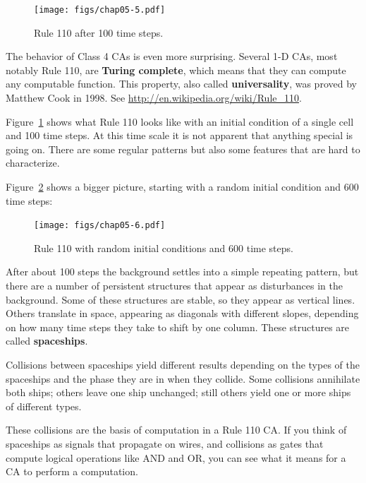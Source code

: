 \documentclass[12pt]{book}
\theoremstyle{exercise}
\begin{document}
\begin{figure}
\centerline{\texttt{[image: figs/chap05-5.pdf]}}
\caption{Rule 110 after 100 time steps.}
\label{chap05-5}
\end{figure}

The behavior of Class 4 CAs is even more surprising.  Several 1-D CAs,
most notably Rule 110, are {\bf Turing complete}, which means that
they can compute any computable function.  This property, also called
{\bf universality}, was proved by Matthew Cook in 1998.  See
\url{http://en.wikipedia.org/wiki/Rule_110}.


Figure~\ref{chap05-5} shows what Rule 110 looks like with an initial
condition of a single cell and 100 time steps.
At this time scale it is not apparent that anything special is
going on.  There are some regular patterns but also some features
that are hard to characterize.

Figure~\ref{chap05-6} shows a bigger picture, starting with a random
initial condition and 600 time steps:

\begin{figure}
\centerline{\texttt{[image: figs/chap05-6.pdf]}}
\caption{Rule 110 with random initial conditions and 600 time steps.}
\label{chap05-6}
\end{figure}

After about 100 steps the background settles into a simple repeating
pattern, but there are a number of persistent structures that appear
as disturbances in the background.  Some of these structures
are stable, so they appear as vertical lines.  Others translate in
space, appearing as diagonals with different slopes, depending on
how many time steps they take to shift by one column.  These
structures are called {\bf spaceships}.


Collisions between spaceships yield different results
depending on the types of the spaceships and the phase they are in
when they collide.  Some collisions annihilate both ships; others
leave one ship unchanged; still others yield one or more ships of
different types.

These collisions are the basis of computation in a Rule 110 CA.  If
you think of spaceships as signals that propagate on wires, and
collisions as gates that compute logical operations like AND and OR,
you can see what it means for a CA to perform a computation.
\end{document}
